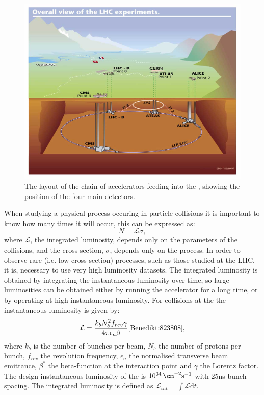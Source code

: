 \begin{figure}
  \includegraphics[width=\largefigwidth]{plots/detector/lhc_layout_sch.jpg}
  \caption{The layout of the chain of accelerators feeding into the \LHC, showing the position of the four main detectors.}
  \label{fig:lhclayout}
\end{figure}

When studying a physical process occuring in particle collisions it is important to know how many times it will occur, this can be expressed as:
\begin{equation}
  N = \mathcal{L}\sigma,
\end{equation}
where $\mathcal{L}$, the integrated luminosity, depends only on the parameters of the collisions, and the cross-section, $\sigma$, depends only on the process. In order to observe rare (i.e. low cross-section) processes, such as those studied at the LHC, it is, necessary to use very high luminosity datasets. The integrated luminosity is obtained by integrating the instantaneous luminosity over time, so large luminosities can be obtained either by running the accelerator for a long time, or by operating at high instantaneous luminosity. For collisions at the \LHC the instantaneous luminosity is given by:
\begin{equation}
  \mathcal{L}=\frac{k_{b}N_{b}^{2}f_{rev}\gamma}{4\pi\epsilon_{n}\beta} \cite{Benedikt:823808},
\end{equation}
where $k_{b}$ is the number of bunches per beam, $N_{b}$ the number of protons per bunch, $f_{rev}$ the revolution frequency, $\epsilon_{n}$ the normalised transverse beam emittance, $\beta^{*}$ the beta-function at the interaction point and $\gamma$ the Lorentz factor. The design instantaneous luminosity of the \LHC is $10^{34}\,\cm^{-2}\rm{s}^{-1}$ with 25ns bunch spacing. The integrated luminosity is defined as $\mathcal{L}_{int}=\int\mathcal{L}\mathrm{d}t$.

